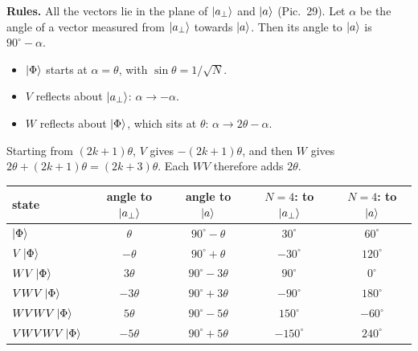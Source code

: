 \documentclass[a4paper, 10pt]{article}
\begin{document}
\begin{solution}
	\noindent \textbf{Rules.} All the vectors lie in the plane of \( \ket{a_\perp} \) and \( \ket{a} \) (Pic.~29). Let \( \alpha \) be the angle of a vector measured from \( \ket{a_\perp} \) towards \( \ket{a} \). Then its angle to \( \ket{a} \) is \( 90^\circ - \alpha \).
	\begin{itemize}
		\item \( \ket{\Phi} \) starts at \( \alpha = \theta \), with \( \sin\theta = 1/\sqrt{N} \).
		\item \( V \) reflects about \( \ket{a_\perp} \): \( \alpha \to -\alpha \).
		\item \( W \) reflects about \( \ket{\Phi} \), which sits at \( \theta \): \( \alpha \to 2\theta - \alpha \).
	\end{itemize}
	Starting from \( (2k + 1)\theta \), \( V \) gives \( -(2k + 1)\theta \), and then \( W \) gives \( 2\theta + (2k + 1)\theta = (2k + 3)\theta \). Each \( WV \) therefore adds \( 2\theta \).
	\begin{center}
		\renewcommand{\arraystretch}{1.25}
		\begin{tabular}{lcccc}
			\toprule
			state                   & angle to \( \ket{a_\perp} \) & angle to \( \ket{a} \)          & \( N = 4 \): to \( \ket{a_\perp} \) & \( N = 4 \): to \( \ket{a} \) \\
			\midrule
			\( \ket{\Phi} \)        & \( \theta \)                 & \( 90^\circ - \theta \)         & \( 30^\circ \)                      & \( 60^\circ \)                \\
			\( V\ket{\Phi} \)       & \( -\theta \)                & \( 90^\circ + \theta \)         & \( -30^\circ \)                     & \( 120^\circ \)               \\
			\( WV\ket{\Phi} \)      & \( 3\theta \)                & \( 90^\circ - 3\theta \)        & \( 90^\circ \)                      & \( 0^\circ \)                 \\
			\( VWV\ket{\Phi} \)     & \( -3\theta \)               & \( 90^\circ + 3\theta \)        & \( -90^\circ \)                     & \( 180^\circ \)               \\
			\( WVWV\ket{\Phi} \)    & \( 5\theta \)                & \( 90^\circ - 5\theta \)        & \( 150^\circ \)                     & \( -60^\circ \)               \\
			\( VWVWV\ket{\Phi} \)   & \( -5\theta \)               & \( 90^\circ + 5\theta \)        & \( -150^\circ \)                    & \( 240^\circ \)               \\

\end{tabular}
\end{center}
\end{solution}
\end{document}
